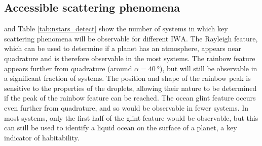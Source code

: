 \documentclass[usenatbib]{mnras}
\newcommand{\IWA}{\ensuremath{\mathrm{IWA}}\xspace}
\newcommand{\HWO}{HabWorlds\xspace}
\begin{document}
\subsection{Accessible scattering phenomena}

 and Table \ref{tab:nstars_detect} show the number of systems in which key scattering phenomena will be observable for different \IWA.
The Rayleigh feature, which can be used to determine if a planet has an atmosphere, appears near quadrature and is therefore observable in the most systems.
The rainbow feature appears further from quadrature (around $\alpha=\qty{40}{\degree}$), but will still be observable in a significant fraction of systems.
The position and shape of the rainbow peak is sensitive to the properties of the droplets, allowing their nature to be determined if the peak of the rainbow feature can be reached.
The ocean glint feature occurs even further from quadrature, and so would be observable in fewer systems. 
In most systems, only the first half of the glint feature would be observable, but this can still be used to identify a liquid ocean on the surface of a planet, a key indicator of habitability. 
\end{document}
